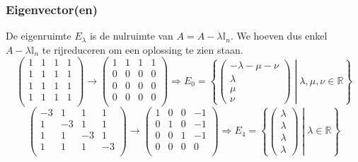 \documentclass[lineaire_algebra_oplossingen.tex]{subfiles}
\begin{document}
\subsubsection*{Eigenvector(en)}
De eigenruimte $E_\lambda$ is de nulruimte van $A = A-\lambda\mathbb{I}_n$. We hoeven dus enkel $A-\lambda\mathbb{I}_n$ te rijreduceren om een oplossing te zien staan.
\[
\begin{pmatrix}
1 & 1 & 1 & 1\\
1 & 1 & 1 & 1\\
1 & 1 & 1 & 1\\
1 & 1 & 1 & 1\\
\end{pmatrix}
\rightarrow
\begin{pmatrix}
1 & 1 & 1 & 1\\
0 & 0 & 0 & 0\\
0 & 0 & 0 & 0\\
0 & 0 & 0 & 0\\
\end{pmatrix}
\Longrightarrow
E_0 = 
\left\lbrace
\begin{pmatrix}
-\lambda-\mu-\nu\\\lambda\\\mu\\\nu
\end{pmatrix}
\middle| \lambda,\mu,\nu\in\mathbb{R}
\right\rbrace
\]
\[
\begin{pmatrix}
-3 & 1 & 1 & 1\\
1 & -3 & 1 & 1\\
1 & 1 & -3 & 1\\
1 & 1 & 1 & -3\\
\end{pmatrix}
\rightarrow
\begin{pmatrix}
1 & 0 & 0 & -1\\
0 & 1 & 0 & -1\\
0 & 0 & 1 & -1\\
0 & 0 & 0 & 0\\
\end{pmatrix}
\Longrightarrow
E_4 = 
\left\lbrace
\begin{pmatrix}
\lambda\\\lambda\\\lambda\\\lambda
\end{pmatrix}
\middle| \lambda\in\mathbb{R}
\right\rbrace
\]
\end{document}
